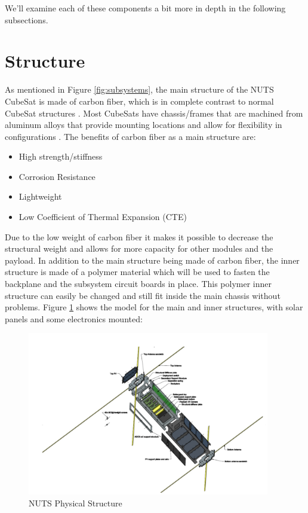 \documentclass[12pt, a4paper]{report}
\begin{document}
We'll examine each of these components a bit more in depth in the following subsections. 

\section{Structure}

As mentioned in Figure \ref{fig:subsystems}, the main structure of the NUTS CubeSat is made of carbon fiber, which is in complete contrast to normal CubeSat structures \cite{nasa_structure}. Most CubeSats have chassis/frames that are machined from aluminum alloys that provide mounting locations and allow for flexibility in configurations \cite{nasa_structure}. The benefits of carbon fiber as a main structure are:
\begin{itemize}
    \item High strength/stiffness
    \item Corrosion Resistance
    \item Lightweight
    \item Low Coefficient of Thermal Expansion (CTE)
\end{itemize}

Due to the low weight of carbon fiber it makes it possible to decrease the structural weight and allows for more capacity for other modules and the payload. In addition to the main structure being made of carbon fiber, the inner structure is made of a polymer material which will be used to fasten the backplane and the subsystem circuit boards in place. This polymer inner structure can easily be changed and still fit inside the main chassis without problems. Figure \ref{fig:structure} shows the model for the main and inner structures, with solar panels and some electronics mounted:

\begin{figure}[H]
    \centering
    \includegraphics[width=300pt]{images/nuts_structure.PNG}
    \caption{NUTS Physical Structure \cite{overview}}
    \label{fig:structure}
\end{figure}
\end{document}
